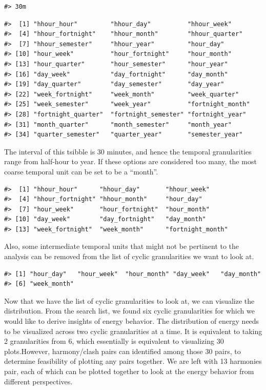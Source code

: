 \documentclass[12pt]{article}
\begin{document}
\begin{verbatim}
#> 30m
\end{verbatim}

\begin{verbatim}
#>  [1] "hhour_hour"         "hhour_day"          "hhour_week"        
#>  [4] "hhour_fortnight"    "hhour_month"        "hhour_quarter"     
#>  [7] "hhour_semester"     "hhour_year"         "hour_day"          
#> [10] "hour_week"          "hour_fortnight"     "hour_month"        
#> [13] "hour_quarter"       "hour_semester"      "hour_year"         
#> [16] "day_week"           "day_fortnight"      "day_month"         
#> [19] "day_quarter"        "day_semester"       "day_year"          
#> [22] "week_fortnight"     "week_month"         "week_quarter"      
#> [25] "week_semester"      "week_year"          "fortnight_month"   
#> [28] "fortnight_quarter"  "fortnight_semester" "fortnight_year"    
#> [31] "month_quarter"      "month_semester"     "month_year"        
#> [34] "quarter_semester"   "quarter_year"       "semester_year"
\end{verbatim}

The interval of this tsibble is 30 minutes, and hence the temporal
granularities range from half-hour to year. If these options are
considered too many, the most coarse temporal unit can be set to be a
``month''.

\begin{verbatim}
#>  [1] "hhour_hour"      "hhour_day"       "hhour_week"     
#>  [4] "hhour_fortnight" "hhour_month"     "hour_day"       
#>  [7] "hour_week"       "hour_fortnight"  "hour_month"     
#> [10] "day_week"        "day_fortnight"   "day_month"      
#> [13] "week_fortnight"  "week_month"      "fortnight_month"
\end{verbatim}

Also, some intermediate temporal units that might not be pertinent to
the analysis can be removed from the list of cyclic granularities we
want to look at.

\begin{verbatim}
#> [1] "hour_day"   "hour_week"  "hour_month" "day_week"   "day_month" 
#> [6] "week_month"
\end{verbatim}

Now that we have the list of cyclic granularities to look at, we can
visualize the distribution. From the search list, we found six cyclic
granularities for which we would like to derive insights of energy
behavior. The distribution of energy needs to be visualized across two
cyclic granularities at a time. It is equivalent to taking 2
granularities from 6, which essentially is equivalent to visualizing 30
plots.However, harmony/clash pairs can identified among those 30 pairs,
to determine feasibility of plotting any pairs together. We are left
with 13 harmonies pair, each of which can be plotted together to look at
the energy behavior from different perspectives.
\end{document}
